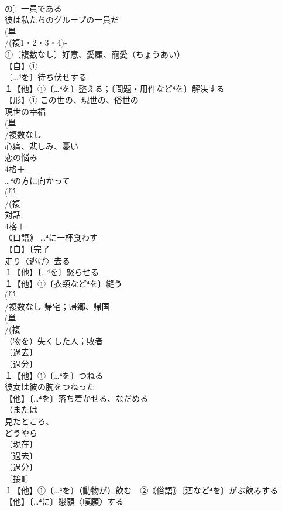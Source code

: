 \documentclass[8pt]{extreport}
\begin{document}
\begin{CJK}{UTF8}{min}
\\	の〕一員である 
\\	彼は私たちのグループの一員だ 
\\	(単
\\	/(複1・2・3・4)‐
\\	①〔複数なし〕好意、愛顧、寵愛（ちょうあい） 
\\	【自】①
\\	〔…⁴を〕待ち伏せする
\\	１【他】①〔…⁴を〕整える；〔問題・用件など⁴を〕解決する 
\\	【形】① この世の、現世の、俗世の 
\\	現世の幸福
\\	(単
\\	/複数なし 
\\	心痛、悲しみ、憂い 
\\	恋の悩み
\\	4格＋
\\	…⁴の方に向かって
\\	(単
\\	/(複
\\	対話 
\\	4格＋
\\	｟口語｠ …⁴に一杯食わす
\\	【自】〔完了
\\	走り〈逃げ〉去る
\\	１【他】〔…⁴を〕怒らせる 
\\	１【他】①〔衣類など⁴を〕縫う
\\	(単
\\	/複数なし 帰宅；帰郷、帰国 
\\	(単
\\	/(複
\\	（物を）失くした人；敗者 
\\	〔過去〕
\\	〔過分〕
\\	１【他】①〔…⁴を〕つねる 
\\	彼女は彼の腕をつねった
\\	【他】〔…⁴を〕落ち着かせる、なだめる 
\\	（または
\\	見たところ、
\\	どうやら
\\	〔現在〕
\\	〔過去〕
\\	〔過分〕
\\	〔接Ⅱ〕
\\	１【他】①〔…⁴を〕（動物が）飲む　②｟俗語｠〔酒など⁴を〕がぶ飲みする 
\\	【他】〔…⁴に〕懇願〈嘆願〉する 

\end{CJK}
\end{document}
